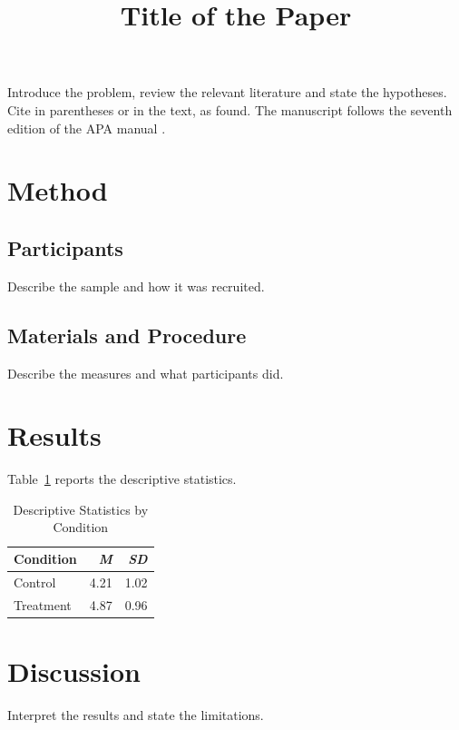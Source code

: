 \documentclass[stu,floatsintext]{apa7}
\title{Title of the Paper}
\begin{document}
\maketitle

Introduce the problem, review the relevant literature and state the
hypotheses. Cite in parentheses \parencite{cohen1988statistical} or in the
text, as \textcite{opensciencecollaboration2015estimating} found. The
manuscript follows the seventh edition of the APA manual
\parencite{apa2020publication}.

\section{Method}
\subsection{Participants}
Describe the sample and how it was recruited.

\subsection{Materials and Procedure}
Describe the measures and what participants did.

\section{Results}
Table~\ref{tab:results} reports the descriptive statistics.

\begin{table}[htbp]
  \caption{Descriptive Statistics by Condition}
  \label{tab:results}
  \begin{tabular}{lrr}
    \toprule
    Condition & \textit{M} & \textit{SD} \\
    \midrule
    Control & 4.21 & 1.02 \\
    Treatment & 4.87 & 0.96 \\
    \bottomrule
  \end{tabular}
\end{table}

\section{Discussion}
Interpret the results and state the limitations.

\printbibliography
\end{document}
